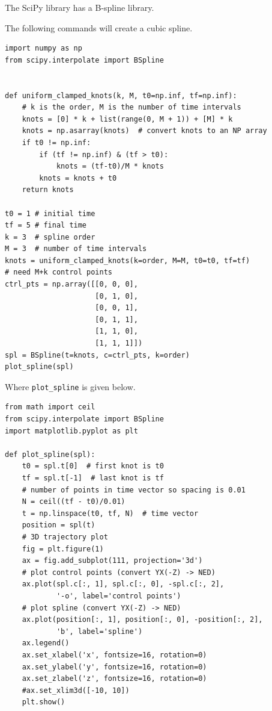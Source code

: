 \par{}
The SciPy library has a B-spline library.  

The following commands will create a cubic spline.
\begin{lstlisting}
import numpy as np
from scipy.interpolate import BSpline
	
	
def uniform_clamped_knots(k, M, t0=np.inf, tf=np.inf):
    # k is the order, M is the number of time intervals
    knots = [0] * k + list(range(0, M + 1)) + [M] * k
    knots = np.asarray(knots)  # convert knots to an NP array
    if t0 != np.inf:
        if (tf != np.inf) & (tf > t0):
            knots = (tf-t0)/M * knots
        knots = knots + t0
    return knots	

t0 = 1 # initial time
tf = 5 # final time
k = 3  # spline order
M = 3  # number of time intervals
knots = uniform_clamped_knots(k=order, M=M, t0=t0, tf=tf)
# need M+k control points
ctrl_pts = np.array([[0, 0, 0],  
                     [0, 1, 0],
                     [0, 0, 1],
                     [0, 1, 1],
                     [1, 1, 0],
                     [1, 1, 1]])
spl = BSpline(t=knots, c=ctrl_pts, k=order)
plot_spline(spl)
\end{lstlisting}

Where {\tt plot\_spline} is given below.
\begin{lstlisting}
from math import ceil
from scipy.interpolate import BSpline
import matplotlib.pyplot as plt

def plot_spline(spl):
    t0 = spl.t[0]  # first knot is t0
    tf = spl.t[-1]  # last knot is tf
    # number of points in time vector so spacing is 0.01
    N = ceil((tf - t0)/0.01)
    t = np.linspace(t0, tf, N)  # time vector
    position = spl(t)
    # 3D trajectory plot
    fig = plt.figure(1)
    ax = fig.add_subplot(111, projection='3d')
    # plot control points (convert YX(-Z) -> NED)
    ax.plot(spl.c[:, 1], spl.c[:, 0], -spl.c[:, 2],
            '-o', label='control points')
    # plot spline (convert YX(-Z) -> NED)
    ax.plot(position[:, 1], position[:, 0], -position[:, 2],
            'b', label='spline')
    ax.legend()
    ax.set_xlabel('x', fontsize=16, rotation=0)
    ax.set_ylabel('y', fontsize=16, rotation=0)
    ax.set_zlabel('z', fontsize=16, rotation=0)
    #ax.set_xlim3d([-10, 10])
    plt.show()
\end{lstlisting}

